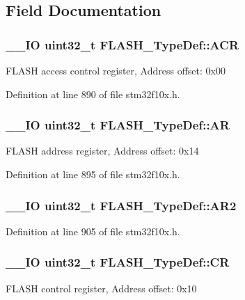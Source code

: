 \subsection{Field Documentation}
\hypertarget{struct_f_l_a_s_h___type_def_aaf432a8a8948613f4f66fcace5d2e5fe}{
\subsubsection[{A\-C\-R}]{\setlength{\rightskip}{0pt plus 5cm}\-\_\-\-\_\-\-I\-O {\bf uint32\-\_\-t} F\-L\-A\-S\-H\-\_\-\-Type\-Def\-::\-A\-C\-R}}\label{struct_f_l_a_s_h___type_def_aaf432a8a8948613f4f66fcace5d2e5fe}
F\-L\-A\-S\-H access control register, Address offset\-: 0x00 

Definition at line 890 of file stm32f10x.\-h.

\hypertarget{struct_f_l_a_s_h___type_def_a9cd77bc29038841798b4b63c5cecdb9d}{
\subsubsection[{A\-R}]{\setlength{\rightskip}{0pt plus 5cm}\-\_\-\-\_\-\-I\-O {\bf uint32\-\_\-t} F\-L\-A\-S\-H\-\_\-\-Type\-Def\-::\-A\-R}}\label{struct_f_l_a_s_h___type_def_a9cd77bc29038841798b4b63c5cecdb9d}
F\-L\-A\-S\-H address register, Address offset\-: 0x14 

Definition at line 895 of file stm32f10x.\-h.

\hypertarget{struct_f_l_a_s_h___type_def_af7502255ac67c0c60dae12cf24b525cd}{
\subsubsection[{A\-R2}]{\setlength{\rightskip}{0pt plus 5cm}\-\_\-\-\_\-\-I\-O {\bf uint32\-\_\-t} F\-L\-A\-S\-H\-\_\-\-Type\-Def\-::\-A\-R2}}\label{struct_f_l_a_s_h___type_def_af7502255ac67c0c60dae12cf24b525cd}


Definition at line 905 of file stm32f10x.\-h.

\hypertarget{struct_f_l_a_s_h___type_def_a7919306d0e032a855200420a57f884d7}{
\subsubsection[{C\-R}]{\setlength{\rightskip}{0pt plus 5cm}\-\_\-\-\_\-\-I\-O {\bf uint32\-\_\-t} F\-L\-A\-S\-H\-\_\-\-Type\-Def\-::\-C\-R}}\label{struct_f_l_a_s_h___type_def_a7919306d0e032a855200420a57f884d7}
F\-L\-A\-S\-H control register, Address offset\-: 0x10 

